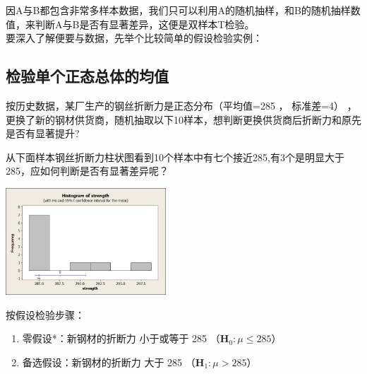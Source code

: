 因A与B都包含非常多样本数据，我们只可以利用A的随机抽样，和B的随机抽样数值，来判断A与B是否有显著差异，这便是双样本T检验。 \\
要深入了解便要与数据，先举个比较简单的假设检验实例：\\

\hypertarget{ux68c0ux9a8cux5355ux4e2aux6b63ux6001ux603bux4f53ux7684ux5747ux503c}{%
\subsection{检验单个正态总体的均值}\label{ux68c0ux9a8cux5355ux4e2aux6b63ux6001ux603bux4f53ux7684ux5747ux503c}}

按历史数据，某厂生产的钢丝折断力是正态分布（平均值=285 ， 标准差=4） ，
更换了新的钢材供货商，随机抽取以下10样本，想判断更换供货商后折断力和原先是否有显著提升?

\begin{description}
\item[]
\end{description}

从下面样本钢丝折断力柱状图看到10个样本中有七个接近285,有3个是明显大于285，应如何判断是否有显著差异呢？

\includegraphics[width=6cm]{1sigmaUnknownHistogram_of_strength.jpg}

按假设检验步骤：

\begin{enumerate}
\tightlist
\item
  零假设*：新钢材的折断力 小于或等于 285
  （\(\mathbf{H}_0: \mu \le 285\)）
\item
  备选假设：新钢材的折断力 大于 285 （\(\mathbf{H}_1: \mu > 285\)）
\end{enumerate}

\begin{description}
\item[]
\end{description}

